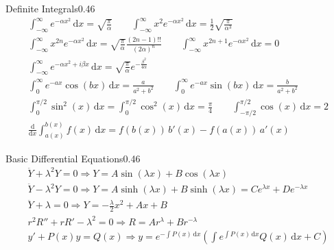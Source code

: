 \begin{mytikzbox}{Definite Integrals}{0.46}
\begin{gather*}
\int_{-\infty}^{\infty}e^{-\alpha x^2}\,\mathrm{d}x
=
\sqrt{\frac{\pi}{\alpha}}
\qquad
\int_{-\infty}^{\infty}x^2e^{-\alpha x^2}\,\mathrm{d}x
=
\frac{1}{2}\sqrt{\frac{\pi}{\alpha^3}}
\\
\int_{-\infty}^{\infty}x^{2n}e^{-\alpha x^2}\,\mathrm{d}x
=
\sqrt{\frac{\pi}{\alpha}}
\frac{(2n-1)!!}{(2\alpha)^n}
\qquad
\int_{-\infty}^{\infty}x^{2n+1}e^{-\alpha x^2}\,\mathrm{d}x
=
0
\\
\int_{-\infty}^{\infty}
e^{-\alpha x^2+i\beta x}\,\mathrm{d}x
=
\sqrt{\frac{\pi}{\alpha}}
e^{-\frac{\beta^2}{4\alpha}}
\\
\int_0^\infty e^{-ax}\cos(bx)\,\mathrm{d}x
=
\frac{a}{a^2+b^2}
\qquad
\int_0^\infty e^{-ax}\sin(bx)\,\mathrm{d}x
=
\frac{b}{a^2+b^2}
\\
\int_0^{\pi/2}\sin^2(x)\,\mathrm{d}x
=
\int_0^{\pi/2}\cos^2(x)\,\mathrm{d}x
=
\frac{\pi}{4}
\qquad
\int_{-\pi/2}^{\pi/2}\cos(x)\,\mathrm{d}x
=
2
\\
\frac{\mathrm{d}}{\mathrm{d}x}
\int_{a(x)}^{b(x)}f(x)\,\mathrm{d}x
=
f(b(x))\,b'(x)-f(a(x))\,a'(x)
\end{gather*}
\end{mytikzbox}

\begin{mytikzbox}{Basic Differential Equations}{0.46}
\begin{gather*}
\ddot{Y}+\lambda^2Y=0
\Rightarrow
Y=A\sin(\lambda x)+B\cos(\lambda x)
\\
\ddot{Y}-\lambda^2Y=0
\Rightarrow
Y=A\sinh(\lambda x)+B\sinh(\lambda x)
=
Ce^{\lambda x}+De^{-\lambda x}
\\
\ddot{Y}+\lambda=0
\Rightarrow
Y=-\frac{\lambda}{2}x^2+Ax+B
\\
r^2R''+rR'-\lambda^2=0
\Rightarrow
R=Ar^\lambda+Br^{-\lambda}
\\
y'+P(x)y=Q(x)
\Rightarrow
y=
e^{-\int P(x)\,\mathrm{d}x}
\left(
\int e^{\int P(x)\,\mathrm{d}x}Q(x)\,\mathrm{d}x+C
\right)
\end{gather*}
\end{mytikzbox}
